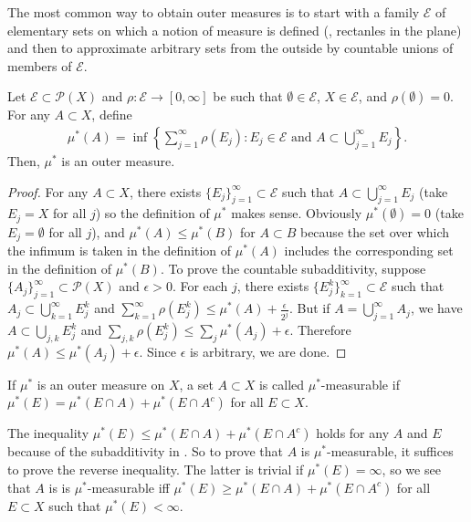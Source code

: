 The most common way to obtain outer measures is to start with a family $\mathcal{E}$ of elementary sets on which a notion of measure is defined (\ie, rectanles in the plane) and then to approximate arbitrary sets from the outside by countable unions of members of $\mathcal{E}$.

\begin{proposition}
    Let $\mathcal{E} \subset \mathcal{P}(X)$ and $\rho : \mathcal{E} \to [0, \infty]$ be such that $\emptyset \in \mathcal{E}$, $X \in \mathcal{E}$, and $\rho(\emptyset) = 0$.
    For any $A \subset X$, define
    \begin{align}
        \mu^*(A) = \inf \left\{ \sum_{j=1}^{\infty} \rho(E_j): E_j \in \mathcal{E} \text{ and } A \subset \bigcup _{j=1}^{\infty} E_j \right\}.
    \end{align}
    Then, $\mu^*$ is an outer measure.
\end{proposition}

\begin{proof}
    For any $A \subset X$, there exists $\{ E_j \}_{j=1}^{\infty} \subset \mathcal{E}$ such that $A \subset \bigcup_{j=1}^{\infty} E_j$ (take $E_j = X$ for all $j$) so the definition of $\mu^*$ makes sense.
    Obviously $\mu^*(\emptyset) = 0$ (take $E_j = \emptyset$ for all $j$), and $\mu^*(A) \le \mu^*(B)$ for $A \subset B$ because the set over which the infimum is taken in the definition of $\mu^*(A)$ includes the corresponding set in the definition of $\mu^*(B)$.
    To prove the countable subadditivity, suppose $\{ A_j \}_{j=1}^{\infty} \subset \mathcal{P}(X)$ and $\epsilon > 0$. For each $j$, there exists $\{ E_{j}^{k} \}_{k=1}^{\infty} \subset \mathcal{E}$ such that $A_j \subset \bigcup_{k=1}^{\infty} E_{j}^{k}$ and $\sum_{k=1}^{\infty} \rho(E_{j}^{k}) \le \mu^*(A) + \frac{\epsilon}{2^j}$. 
    But if $A = \bigcup_{j=1}^{\infty} A_j$, we have $A \subset \bigcup_{j,k} E_{j}^{k}$ and $\sum_{j,k} \rho(E_{j}^{k}) \le \sum_{j} \mu^*(A_j) + \epsilon$.
    Therefore $\mu^*(A) \le \mu^*(A_j) + \epsilon$.
    Since $\epsilon$ is arbitrary, we are done.
\end{proof}

\begin{definition}
    If $\mu^*$ is an outer measure on $X$, a set $A \subset X$ is called $\mu^*$-measurable if $\mu^*(E) = \mu^*(E \cap A) + \mu^*(E \cap A^c)$ for all $E \subset X$.
\end{definition}

The inequality $\mu^*(E) \le \mu^*(E \cap A) + \mu^*(E \cap A^c)$ holds for any $A$ and $E$ because of the subadditivity in .
So to prove that $A$ is $\mu^*$-measurable, it suffices to prove the reverse inequality.
The latter is trivial if $\mu^*(E) = \infty$, so we see that $A$ is is $\mu^*$-measurable iff $\mu^*(E) \ge \mu^*(E \cap A) + \mu^*(E \cap A^c)$ for all $E \subset X$ such that $\mu^*(E) < \infty$.

